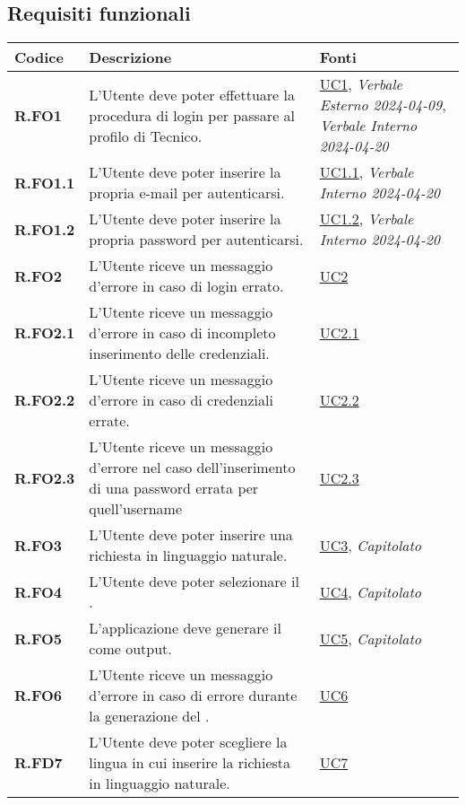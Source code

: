 \subsection{Requisiti funzionali}
\begin{longtable}{|P{3cm}|P{6,5cm}|>{\arraybackslash}P{4cm}|}
    \hline
    \textbf{Codice} & \textbf{Descrizione} & \textbf{Fonti} \\
    \hline
    \textbf{R.FO1} & L’Utente deve poter effettuare la procedura di login per passare al profilo di Tecnico. &  \hyperref[UC1]{UC1}, \emph{Verbale Esterno 2024-04-09}, \emph{Verbale Interno 2024-04-20}\\
    \hline
    \textbf{R.FO1.1} & L’Utente deve poter inserire la propria e-mail per autenticarsi. & \hyperref[UC1point1]{UC1.1}, \emph{Verbale Interno 2024-04-20}\\
    \hline
    \textbf{R.FO1.2} & L’Utente deve poter inserire la propria password per autenticarsi. & \hyperref[UC1point2]{UC1.2}, \emph{Verbale Interno 2024-04-20}\\
    \hline
    \textbf{R.FO2} & L'Utente riceve un messaggio d'errore in caso di login errato. &  \hyperref[UC2]{UC2}\\
    \hline
    \textbf{R.FO2.1} & L'Utente  riceve un messaggio d'errore in caso di incompleto inserimento delle credenziali. & \hyperref[UC2point1]{UC2.1}\\
    \hline
    \textbf{R.FO2.2} & L’Utente  riceve un messaggio d'errore in caso di credenziali errate. & \hyperref[UC2point2]{UC2.2}\\
    \hline
    \textbf{R.FO2.3} & L’Utente  riceve un messaggio d'errore nel caso dell'inserimento di una password errata per quell'username & \hyperref[UC2point3]{UC2.3}\\
    \hline
    \textbf{R.FO3} & L’Utente  deve poter inserire una richiesta in linguaggio naturale. &  \hyperref[UC3]{UC3}, \emph{Capitolato}\\
    \hline
    \textbf{R.FO4} & L’Utente  deve poter selezionare il . &  \hyperref[UC4]{UC4}, \emph{Capitolato}\\
    \hline
    \textbf{R.FO5} & L'applicazione deve generare il  come output. &  \hyperref[UC5]{UC5}, \emph{Capitolato}\\
    \hline
    \textbf{R.FO6} & L’Utente  riceve un messaggio d'errore in caso di errore durante la generazione del . &  \hyperref[UC6]{UC6}\\
    \hline
    \textbf{R.FD7} & L’Utente  deve poter scegliere la lingua in cui inserire la richiesta in linguaggio naturale. &  \hyperref[UC7]{UC7}\\

\end{longtable}
